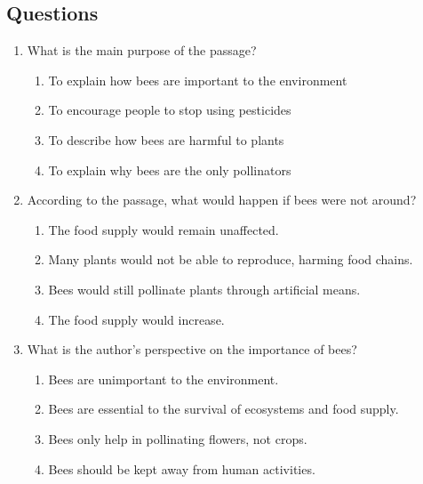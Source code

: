 \documentclass[12pt]{article}
\begin{document}
\subsection*{Questions}
\begin{enumerate}

    \item What is the main purpose of the passage?
    \begin{enumerate}[label=\Alph*.]
        \item To explain how bees are important to the environment
        \item To encourage people to stop using pesticides
        \item To describe how bees are harmful to plants
        \item To explain why bees are the only pollinators
    \end{enumerate}

    \vspace{0.5cm}

    \item According to the passage, what would happen if bees were not around?
    \begin{enumerate}[label=\Alph*.]
        \item The food supply would remain unaffected.
        \item Many plants would not be able to reproduce, harming food chains.
        \item Bees would still pollinate plants through artificial means.
        \item The food supply would increase.
    \end{enumerate}

    \vspace{0.5cm}

    \item What is the author's perspective on the importance of bees?
    \begin{enumerate}[label=\Alph*.]
        \item Bees are unimportant to the environment.
        \item Bees are essential to the survival of ecosystems and food supply.
        \item Bees only help in pollinating flowers, not crops.
        \item Bees should be kept away from human activities.
    \end{enumerate}


\end{enumerate}
\end{document}
